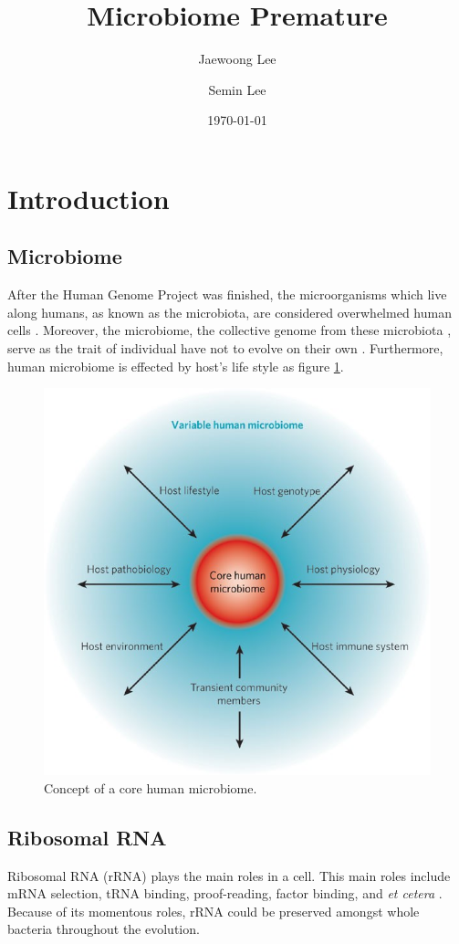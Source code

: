 \documentclass[a4paper]{article}
\title{Microbiome Premature}
\author{
    Jaewoong Lee
    \and
    Semin Lee
}
\date{\today}
\begin{document}
   	\maketitle
    \newpage

    \tableofcontents
    \listoftables
    \listoffigures
    \newpage

    \section{Introduction}
        \subsection{Microbiome}
            After the Human Genome Project was finished, the microorganisms which live along humans, as known as the microbiota, are considered overwhelmed human cells \cite{micro1}. Moreover, the microbiome, the collective genome from these microbiota \cite{micro2}, serve as the trait of individual have not to evolve on their own \cite{micro1}. Furthermore, human microbiome is effected by host's life style as figure \ref{fig:microbiome}.

            \begin{figure}[p]
                \centering
                \includegraphics[width=0.4 \linewidth]{figures/microbiome.jpg}
                \caption{Concept of a core human microbiome. \protect \cite{micro1}}
                \label{fig:microbiome}
            \end{figure}

        \subsection[rRNA]{Ribosomal RNA}
            Ribosomal RNA (rRNA) plays the main roles in a cell. This main roles include mRNA selection, tRNA binding, proof-reading, factor binding, and \textit{et cetera} \cite{rrna2}. Because of its momentous roles, rRNA could be preserved amongst whole bacteria throughout the evolution.
\end{document}
